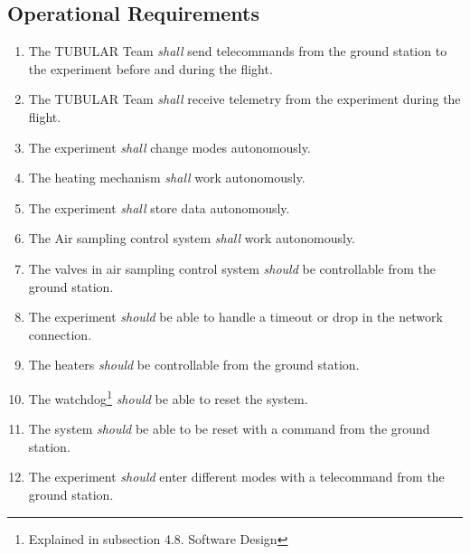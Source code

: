 \pagebreak
\subsection{Operational Requirements}

\begin{enumerate}[label=O.\arabic*]
    \item The TUBULAR Team \textit{shall} send telecommands from the ground station to the experiment before and during the flight.
    \item The TUBULAR Team \textit{shall} receive telemetry from the experiment during the flight.
    \item The experiment \textit{shall} change modes autonomously.
    \item The heating mechanism \textit{shall} work autonomously.
    \item The experiment \textit{shall} store data autonomously.
    \item The Air sampling control system \textit{shall} work autonomously.
    \item The valves in air sampling control system \textit{should} be controllable from the ground station.
    \item The experiment \textit{should} be able to handle a timeout or drop in the network connection.
    \item The heaters \textit{should} be controllable from the ground station.
    \item The watchdog\footnote{Explained in subsection 4.8. Software Design} \textit{should} be able to reset the system.
    \item The system \textit{should} be able to be reset with a command from the ground station.
    \item The experiment \textit{should} enter different modes with a telecommand from the ground station.
\end{enumerate} 
